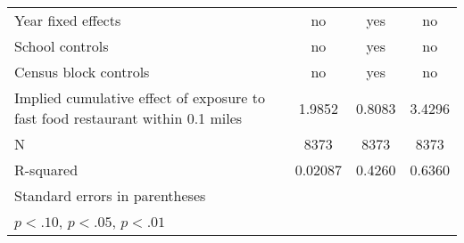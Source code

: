 {\begin{tabular}{l*{3}{c}}
Year fixed effects  &          no         &         yes         &          no         \\
School controls     &          no         &         yes         &          no         \\
Census block controls&          no         &         yes         &          no         \\
Implied cumulative effect of exposure to fast food restaurant within 0.1 miles&      1.9852         &      0.8083         &      3.4296         \\
N                   &        8373         &        8373         &        8373         \\
R-squared           &     0.02087         &      0.4260         &      0.6360         \\
\hline\hline
\multicolumn{4}{l}{\footnotesize Standard errors in parentheses}\\
\multicolumn{4}{l}{\footnotesize \sym{*} \(p<.10\), \sym{**} \(p<.05\), \sym{***} \(p<.01\)}\\
\end{tabular}
}
